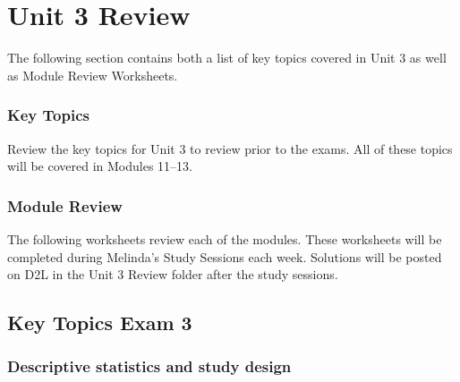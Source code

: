 \documentclass[
]{report}
\begin{document}
\newpage

\chapter{Unit 3 Review}\label{unit-3-review}

The following section contains both a list of key topics covered in Unit 3 as well as Module Review Worksheets.

\subsection{Key Topics}\label{key-topics-13}

Review the key topics for Unit 3 to review prior to the exams. All of these topics will be covered in Modules 11--13.

\subsection{Module Review}\label{module-review-2}


The following worksheets review each of the modules. These worksheets will be completed during Melinda's Study Sessions each week. Solutions will be posted on D2L in the Unit 3 Review folder after the study sessions.

\newpage

\section{Key Topics Exam 3}\label{key-topics-exam-3}

\subsection*{Descriptive statistics and study design}\label{descriptive-statistics-and-study-design-2}
\end{document}

